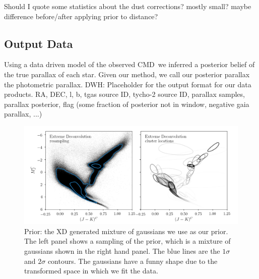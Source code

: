\documentclass[modern]{aastex61}
\newcommand{\acronym}[1]{{\small{#1}}}
\newcommand{\cmd}{\acronym{CMD}}
\begin{document}
Should I quote some statistics about the dust corrections? mostly small? maybe difference before/after applying prior to distance?

\subsection{Output Data}
Using a data driven model of the observed \cmd\ we inferred a posterior belief of the true parallax of each star. Given our method, we call our posterior parallax the photometric parallax.
DWH: Placeholder for the output format for our data products.
RA, DEC, l, b, tgas source ID, tycho-2 source ID, parallax samples, parallax posterior, flag (some fraction of posterior not in window, negative gaia parallax, ...)

\begin{figure}
\centering
  \includegraphics[width=\textwidth]{prior_ngauss128.png}
\caption{Prior: the XD generated mixture of gaussians we use as our prior. The left panel shows a sampling of the prior, which is a mixture of gaussians shown in the right hand panel. The blue lines are the $1\sigma$ and $2\sigma$ contours. The gaussians have a funny shape due to the transformed space in which we fit the data.}
\label{fig:prior}
\end{figure}

\end{document}
